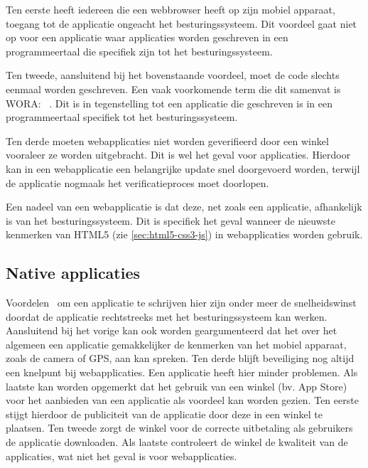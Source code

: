 Ten eerste heeft iedereen die een webbrowser heeft op zijn mobiel apparaat, toegang tot de applicatie ongeacht het besturingssysteem.
Dit voordeel gaat niet op voor een  applicatie waar applicaties worden geschreven in een programmeertaal die specifiek zijn tot het besturingssysteem.

Ten tweede, aansluitend bij het bovenstaande voordeel, moet de code slechts eenmaal worden geschreven. 
Een vaak voorkomende term die dit samenvat is WORA: ~\cite{Hales2012}. 
Dit is in tegenstelling tot een  applicatie die geschreven is in een programmeertaal specifiek tot het besturingssysteem. 

Ten derde moeten webapplicaties niet worden geverifieerd door een winkel vooraleer ze worden uitgebracht. 
Dit is wel het geval voor  applicaties. 
Hierdoor kan in een webapplicatie een belangrijke update snel doorgevoerd worden, terwijl de  applicatie nogmaals het verificatieproces moet doorlopen.

Een nadeel van een webapplicatie is dat deze, net zoals een  applicatie, afhankelijk is van het besturingssysteem.
Dit is specifiek het geval wanneer de nieuwste kenmerken van HTML5 (zie \ref{sec:html5-css3-js}) in webapplicaties worden gebruik.

\subsection{Native applicaties}
\label{sec:literatuur-native}
Voordelen~\cite{Accenture2012} om een  applicatie te schrijven hier zijn onder meer de snelheidswinst doordat de applicatie rechtstreeks met het besturingssysteem kan werken. 
Aansluitend bij het vorige kan ook worden geargumenteerd dat het over het algemeen een  applicatie gemakkelijker de kenmerken van het mobiel apparaat, zoals de camera of GPS, aan kan spreken. 
Ten derde blijft beveiliging nog altijd een knelpunt bij webapplicaties. Een  applicatie heeft hier minder problemen. 
Als laatste kan worden opgemerkt dat het gebruik van een winkel (bv. App Store) voor het aanbieden van een applicatie als voordeel kan worden gezien.
Ten eerste stijgt hierdoor de publiciteit van de applicatie door deze in een winkel te plaatsen.
Ten tweede zorgt de winkel voor de correcte uitbetaling als gebruikers de applicatie downloaden.
Als laatste controleert de winkel de kwaliteit van de applicaties, wat niet het geval is voor webapplicaties.

